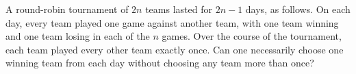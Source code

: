 A round-robin tournament of $2n$ teams lasted for $2n-1$ days, as follows.
On each day, every team played one game against another team, with one team winning
and one team losing in each of the $n$ games. Over the course of the tournament,
each team played every other team exactly once. Can one necessarily choose
one winning team from each day without choosing any team more than once?
